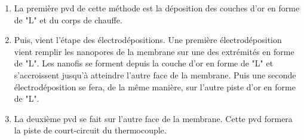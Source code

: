 \begin{itemize}
\begin{enumerate}[label=(\alph*), wide, labelwidth=!, labelindent = 0pt]
              \item La première \gls{pvd} de cette méthode est la déposition des couches d'or en forme de "L" et du corps de chauffe.\\
              \item Puis, vient l'étape des électrodépositions. Une première électrodéposition vient remplir les nanopores de la membrane sur une
                    des extrémités en forme de "L". Les nanofis se forment depuis la couche d'or en forme de "L" et s'accroissent jusqu'à 
                    atteindre l'autre face de la membrane. Puis une seconde électrodéposition se fera, de la même manière, sur l'autre piste d'or 
                    en forme de "L".\\
              \item La deuxième \gls{pvd} se fait sur l'autre face de la membrane. Cette \gls{pvd} formera la piste de court-circuit du thermocouple.
          \end{enumerate}
\end{itemize}

\newpage
